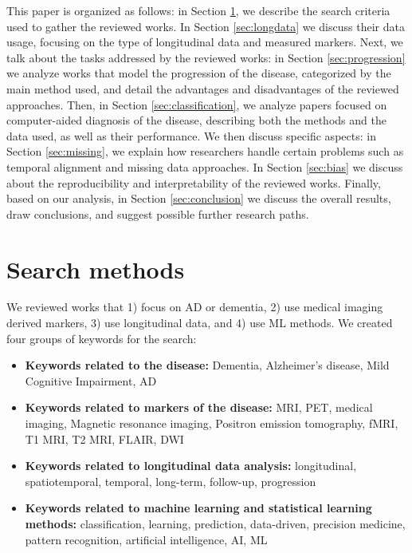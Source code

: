 This paper is organized as follows: in Section \ref{sec:search}, we describe the search criteria used to gather the reviewed works. In Section \ref{sec:longdata} we discuss their data usage, focusing on the type of longitudinal data and measured markers. Next, we talk about the tasks addressed by the reviewed works: in Section \ref{sec:progression} we analyze works that model the progression of the disease, categorized by the main method used, and detail the advantages and disadvantages of the reviewed approaches. Then, in Section \ref{sec:classification}, we analyze papers focused on computer-aided diagnosis of the disease, describing both the methods and the data used, as well as their performance. We then discuss specific aspects: in Section \ref{sec:missing}, we explain how researchers handle certain problems such as temporal alignment and missing data approaches. In Section \ref{sec:bias} we discuss about the reproducibility and interpretability of the reviewed works. Finally, based on our analysis, in Section \ref{sec:conclusion} we discuss the overall results, draw conclusions, and suggest possible further research paths. \\

\section{Search methods}
\label{sec:search}

We reviewed works that 1) focus on AD or dementia, 2) use medical imaging derived markers, 3) use longitudinal data, and 4) use ML methods. We created four groups of keywords for the search:

\begin{itemize}\itemsep5pt
  \item \textbf{Keywords related to the disease:} Dementia, Alzheimer’s disease, Mild Cognitive Impairment, AD
  \item \textbf{Keywords related to markers of the disease:} MRI, PET, medical imaging, Magnetic resonance imaging, Positron emission tomography, fMRI, T1 MRI, T2 MRI, FLAIR, DWI
  \item \textbf{Keywords related to longitudinal data analysis:} longitudinal, spatiotemporal, temporal, long-term, follow-up, progression
  \item \textbf{Keywords related to machine learning and statistical learning methods:} classification, learning, prediction, data-driven, precision medicine, pattern recognition, artificial intelligence, AI, ML
\end{itemize}

